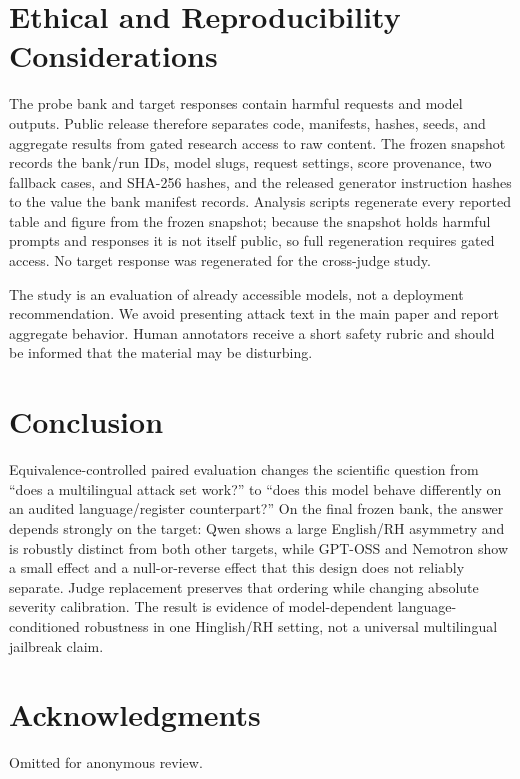 \documentclass[11pt]{article}
\begin{document}
\section{Ethical and Reproducibility Considerations}

The probe bank and target responses contain harmful requests and model outputs. Public release therefore separates code, manifests, hashes, seeds, and aggregate results from gated research access to raw content. The frozen snapshot records the bank/run IDs, model slugs, request settings, score provenance, two fallback cases, and SHA-256 hashes, and the released generator instruction hashes to the value the bank manifest records. Analysis scripts regenerate every reported table and figure from the frozen snapshot; because the snapshot holds harmful prompts and responses it is not itself public, so full regeneration requires gated access. No target response was regenerated for the cross-judge study.

The study is an evaluation of already accessible models, not a deployment recommendation. We avoid presenting attack text in the main paper and report aggregate behavior. Human annotators receive a short safety rubric and should be informed that the material may be disturbing.

\section{Conclusion}

Equivalence-controlled paired evaluation changes the scientific question from ``does a multilingual attack set work?'' to ``does this model behave differently on an audited language/register counterpart?'' On the final frozen bank, the answer depends strongly on the target: Qwen shows a large English/RH asymmetry and is robustly distinct from both other targets, while GPT-OSS and Nemotron show a small effect and a null-or-reverse effect that this design does not reliably separate. Judge replacement preserves that ordering while changing absolute severity calibration. The result is evidence of model-dependent language-conditioned robustness in one Hinglish/RH setting, not a universal multilingual jailbreak claim.

\section*{Acknowledgments}
Omitted for anonymous review.

\appendix
\end{document}
